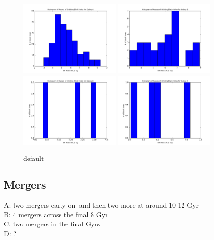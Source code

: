 \documentclass[english, apj]{emulateapj}
\begin{document}
\begin{figure}[htbp]
\begin{center}
\includegraphics[width=0.45\textwidth]{plots/orbiting_bh_mass_histogram_gal_1.png}
\includegraphics[width=0.45\textwidth]{plots/orbiting_bh_mass_histogram_gal_65.png}\\
\includegraphics[width=0.45\textwidth]{plots/orbiting_bh_mass_histogram_gal_187.png}
\includegraphics[width=0.45\textwidth]{plots/orbiting_bh_mass_histogram_gal_217.png}\\
\caption{default}
\label{default}
\end{center}
\end{figure}

\subsection{Mergers}
\noindent A: two mergers early on, and then two more at around 10-12 Gyr\\
B: 4 mergers across the final 8 Gyr\\
C: two mergers in the final Gyrs\\
D: ?\\
\end{document}
